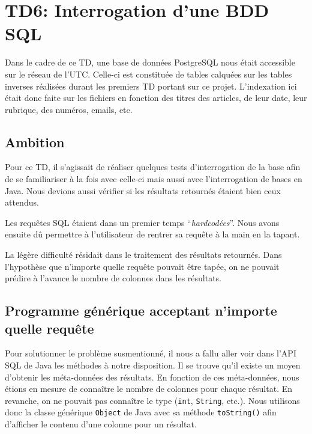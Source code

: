 \chapter{TD6: Interrogation d'une BDD SQL}

Dans le cadre de ce TD, une base de données PostgreSQL nous était accessible sur le réseau de l'UTC. Celle-ci est constituée de tables calquées sur les tables inverses réalisées durant les premiers TD portant sur ce projet. L'indexation ici était donc faite sur les fichiers en fonction des titres des articles, de leur date, leur rubrique, des numéros, emails, etc.

\section{Ambition}

Pour ce TD, il s'agissait de réaliser quelques tests d'interrogation de la base afin de se familiariser à la fois avec celle-ci mais aussi avec l'interrogation de bases en Java. Nous devions aussi vérifier si les résultats retournés étaient bien ceux attendus.

\medskip

Les requêtes SQL étaient dans un premier temps ``\textit{hardcodées}''. Nous avons ensuite dû permettre à l'utilisateur de rentrer sa requête à la main en la tapant.

\medskip

La légère difficulté résidait dans le traitement des résultats retournés. Dans l'hypothèse que n'importe quelle requête pouvait être tapée, on ne pouvait prédire à l'avance le nombre de colonnes dans les résultats.

\section{Programme générique acceptant n'importe quelle requête}
\java
Pour solutionner le problème susmentionné, il nous a fallu aller voir dans l'API SQL de Java les méthodes à notre disposition. Il se trouve qu'il existe un moyen d'obtenir les méta-données des résultats. En fonction de ces méta-données, nous étions en mesure de connaître le nombre de colonnes pour chaque résultat. En revanche, on ne pouvait pas connaître le type (\lstinline{int}, \lstinline{String}, etc.). Nous utilisons donc la classe générique \lstinline{Object} de Java avec sa méthode \lstinline{toString()} afin d'afficher le contenu d'une colonne pour un résultat.

\medskip

